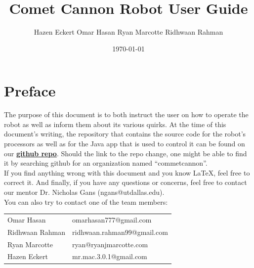 \documentclass[letterpaper,12pt]{report}
\newcommand{\botname}{Comet Cannon }
\newcommand{\github}{\href{https://github.com/cometcannon/tshirt-cannon-robot}
        {\textbf{github repo}}}
\begin{document}
\title{\textbf{\botname Robot User Guide}}
\author{Hazen Eckert \hspace{3mm} Omar Hasan \hspace{3mm} Ryan Marcotte
        \hspace{3mm} Ridhwaan Rahman}

\date{\today}
\maketitle

\pagebreak

\section*{Preface}
\label{sec:preface}
The purpose of this document is to both instruct the user on how to operate the
robot as well as inform them about its various quirks. At the time of this
document's writing, the repository that contains the source code for the
robot's processors as well as for the Java app that is used to control it can
be found on our \github. Should the link to the repo change, one might be able
to find it by searching github for an organization named ``commetcannon''.\\

If you find anything wrong with this document and you know LaTeX, feel free to
correct it. And finally, if you have any questions or concerns, feel free to
contact our mentor Dr. Nicholas Gans (ngans@utdallas.edu).\\

You can also try to contact one of the team members:\\
\begin{center}
\begin{tabular}{l l}
    Omar Hasan & omarhasan777@gmail.com \\
    Ridhwaan Rahman & ridhwaan.rahman99@gmail.com \\
    Ryan Marcotte & ryan@ryanjmarcotte.com \\
    Hazen Eckert & mr.mac.3.0.1@gmail.com \\
\end{tabular}
\end{center}
\end{document}
